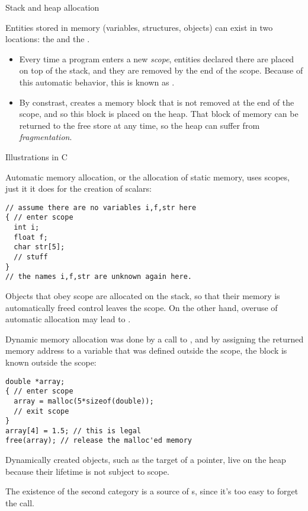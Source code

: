  {Stack and heap allocation}
\label{sec:stack-heap}

Entities stored in memory (variables, structures, objects) can exist
in two locations: the  and the
.
\begin{itemize}
\item Every time a program enters a new
  \emph{scope}, entities declared there are
  placed on top of the stack, and they are removed by the end of the
  scope. Because of this automatic behavior,
  this is known as .
\item By constrast, 
  creates a memory block that is not removed at the end of the scope,
  and so this block is placed on the heap.
  That block of memory can be returned to the free store at any
  time, so the heap can suffer from
  \emph{fragmentation}.
\end{itemize}

 {Illustrations in C}

Automatic memory allocation, or the allocation of static memory,
uses scopes, just it it does for the creation of scalars:
\begin{lstlisting}
// assume there are no variables i,f,str here
{ // enter scope
  int i;
  float f;
  char str[5];
  // stuff
}
// the names i,f,str are unknown again here.
\end{lstlisting}
Objects that obey scope are allocated on the stack, so that
their memory is automatically freed control leaves the scope.
On the other hand, overuse of automatic allocation
may lead to .

Dynamic memory allocation was done by a call to ,
and by assigning the returned memory address to a variable
that was defined outside the scope, the block is known outside the scope:
\begin{lstlisting}
double *array;
{ // enter scope
  array = malloc(5*sizeof(double));
  // exit scope
}
array[4] = 1.5; // this is legal
free(array); // release the malloc'ed memory
\end{lstlisting}
Dynamically created objects, such as the target of a pointer,
live on the heap because their lifetime is not subject to scope.

The existence of the second category is a source of
s, since it's too easy to forget the  call.

